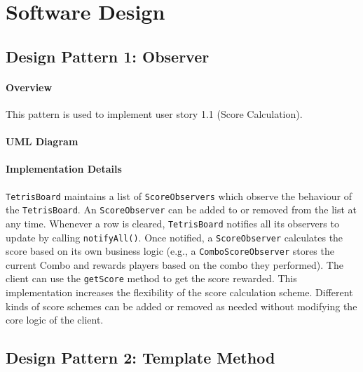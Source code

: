 \documentclass{article}
\begin{document}
\newpage

\section{Software Design}

\subsection{Design Pattern 1: Observer}

\paragraph{Overview}
This pattern is used to implement user story 1.1 (Score Calculation).

\paragraph{UML Diagram}\hfill

\begin{figure}[H]
    
\end{figure}

\paragraph{Implementation Details}

\verb`TetrisBoard` maintains a list of \verb`ScoreObservers` which observe the behaviour of the \verb`TetrisBoard`. An \verb`ScoreObserver` can be added to or removed from the list at any time. Whenever a row is cleared, \verb`TetrisBoard` notifies all its observers to update by calling \verb`notifyAll()`. Once notified, a \verb`ScoreObserver` calculates the score based on its own business logic (e.g., a \verb`ComboScoreObserver` stores the current Combo and rewards players based on the combo they performed). The client can use the \verb`getScore` method to get the score rewarded. This implementation increases the flexibility of the score calculation scheme. Different kinds of score schemes can be added or removed as needed without modifying the core logic of the client.

\clearpage

\subsection{Design Pattern 2: Template Method}
\end{document}

